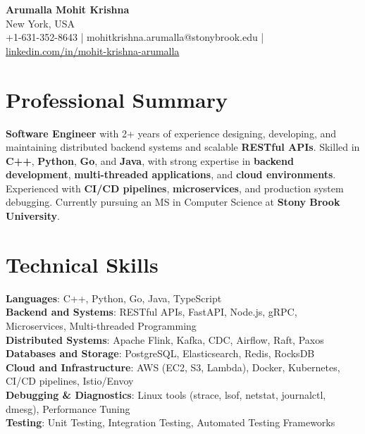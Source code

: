\documentclass[letterpaper,11pt]{article}
\begin{document}
\begin{center}
  {\Large \textbf{Arumalla Mohit Krishna}} \\
  New York, USA \\
  +1-631-352-8643 \enspace | \enspace mohitkrishna.arumalla@stonybrook.edu \enspace | \enspace \href{https://www.linkedin.com/in/mohit-krishna-arumalla}{linkedin.com/in/mohit-krishna-arumalla}
\end{center}

\section{Professional Summary}
  \begin{itemize}[leftmargin=0.15in, label={}]
    \small{\item{
     \textbf{Software Engineer} with 2+ years of experience designing, developing, and maintaining distributed backend systems and scalable \textbf{RESTful APIs}. Skilled in \textbf{C++}, \textbf{Python}, \textbf{Go}, and \textbf{Java}, with strong expertise in \textbf{backend development}, \textbf{multi-threaded applications}, and \textbf{cloud environments}. Experienced with \textbf{CI/CD pipelines}, \textbf{microservices}, and production system debugging. Currently pursuing an MS in Computer Science at \textbf{Stony Brook University}.
    }}
  \end{itemize}
\vspace{-16pt}

\section{Technical Skills}
 \begin{itemize}[leftmargin=0.15in, label={}]
    \small{\item{
     \textbf{Languages}: C++, Python, Go, Java, TypeScript \\
     \textbf{Backend and Systems}: RESTful APIs, FastAPI, Node.js, gRPC, Microservices, Multi-threaded Programming \\
     \textbf{Distributed Systems}: Apache Flink, Kafka, CDC, Airflow, Raft, Paxos \\
     \textbf{Databases and Storage}: PostgreSQL, Elasticsearch, Redis, RocksDB \\
     \textbf{Cloud and Infrastructure}: AWS (EC2, S3, Lambda), Docker, Kubernetes, CI/CD pipelines, Istio/Envoy \\
     \textbf{Debugging \& Diagnostics}: Linux tools (strace, lsof, netstat, journalctl, dmesg), Performance Tuning \\
     \textbf{Testing}: Unit Testing, Integration Testing, Automated Testing Frameworks 
    }}
 \end{itemize}
\vspace{-16pt}
\end{document}
